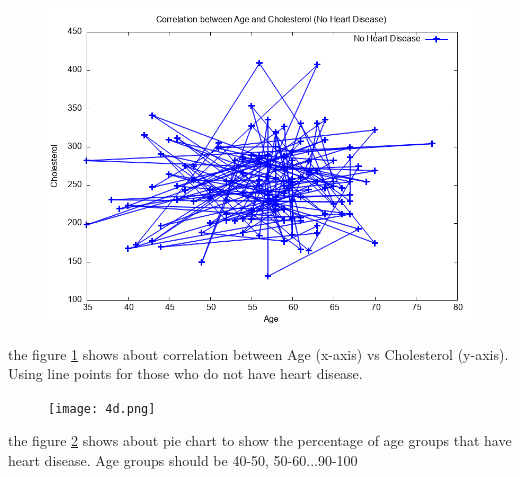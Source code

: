 \documentclass{article}
\begin{document}
	\begin{figure}[H]
	\includegraphics[width=\textwidth]{4c.png}
	\label{fig:Age vs Cholesterol}
	\end{figure}
	the figure \ref{fig:Age vs Cholesterol} shows about correlation between Age (x-axis) vs Cholesterol (y-axis). Using line points for those who do not have heart disease.
	
	\begin{figure}[H]
	\texttt{[image: 4d.png]}
	\label{fig:piechart}
	\end{figure}
	the figure \ref{fig:piechart} shows about pie chart to show the percentage of age groups that have heart disease. Age groups should be 40-50, 50-60...90-100
\end{document}
